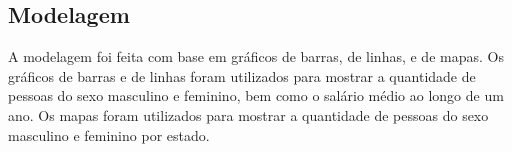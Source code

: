 \subsection{Modelagem}

A modelagem foi feita com base em gráficos de barras, de linhas, e de mapas. Os gráficos de barras e de linhas foram utilizados para mostrar a quantidade de pessoas do sexo masculino e feminino, bem como o salário médio ao longo de um ano. Os mapas foram utilizados para mostrar a quantidade de pessoas do sexo masculino e feminino por estado.